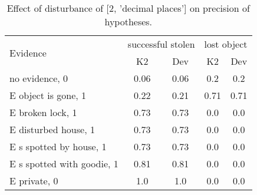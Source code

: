 \begin{table}\begin{tabular}{l|cc|cc}\toprule\multirow{2}{*}{Evidence} & \multicolumn{2}{c}{successful stolen}& \multicolumn{2}{c}{lost object}\\& {K2} & {Dev}& {K2} & {Dev}\\\midrule
no evidence, 0 & 0.06&0.06&0.2&0.2\\E object is gone, 1 & 0.22&0.21&0.71&0.71\\E broken lock, 1 & 0.73&0.73&0.0&0.0\\E disturbed house, 1 & 0.73&0.73&0.0&0.0\\E s spotted by house, 1 & 0.73&0.73&0.0&0.0\\E s spotted with goodie, 1 & 0.81&0.81&0.0&0.0\\E private, 0 & 1.0&1.0&0.0&0.0\\\bottomrule\end{tabular}\caption{Effect of disturbance of [2, 'decimal places'] on precision of hypotheses.}\end{table}